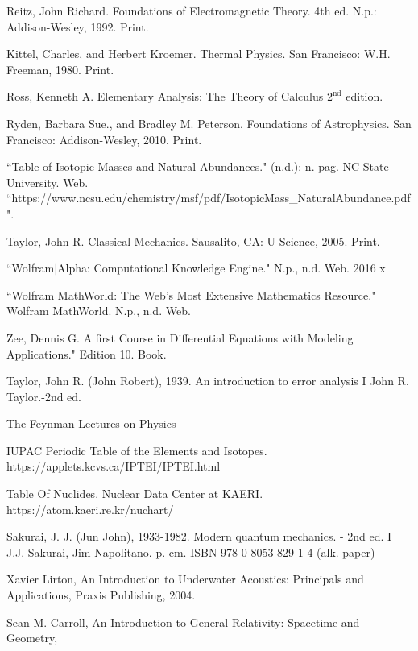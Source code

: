 {\begin{thebibliography}{99}
	
	 Reitz, John Richard. Foundations of Electromagnetic Theory. 4th ed. N.p.: Addison-Wesley, 1992. Print. 
	
	  Kittel, Charles, and Herbert Kroemer. Thermal Physics. San Francisco: W.H. Freeman, 1980. Print.
	
	
	 Ross, Kenneth A. Elementary Analysis: The Theory of Calculus $2^{\textrm{nd}}$ edition. 
	
	 Ryden, Barbara Sue., and Bradley M. Peterson. Foundations of Astrophysics. San Francisco: Addison-Wesley, 2010. Print. 
	
	 ``Table of Isotopic Masses and Natural Abundances." (n.d.): n. pag. NC State University. Web. ``https://www.ncsu.edu/chemistry/msf/pdf/IsotopicMass\_NaturalAbundance.pdf". 
	
	 Taylor, John R. Classical Mechanics. Sausalito, CA: U Science, 2005. Print. 
	
	 ``Wolfram$|$Alpha: Computational Knowledge Engine." N.p., n.d. Web. 2016 x
	
	 ``Wolfram MathWorld: The Web's Most Extensive Mathematics Resource." Wolfram MathWorld. N.p., n.d. Web. 
	
	 Zee, Dennis G. A first Course in Differential Equations with Modeling Applications." Edition 10. Book.
	
	 Taylor, John R. (John Robert), 1939. An introduction to error analysis I John R. Taylor.-2nd ed.
	
	 The Feynman Lectures on Physics

 	 IUPAC Periodic Table of the Elements and Isotopes. https://applets.kcvs.ca/IPTEI/IPTEI.html

  	 Table Of Nuclides.  Nuclear Data Center at KAERI. https://atom.kaeri.re.kr/nuchart/

   	 Sakurai, J. J. (Jun John), 1933-1982. Modern quantum mechanics. - 2nd ed. I J.J. Sakurai, Jim Napolitano. p. cm. ISBN 978-0-8053-829 1-4 (alk. paper)

	 Xavier Lirton, An Introduction to Underwater Acoustics: Principals and Applications, Praxis Publishing, 2004.

	 Sean M. Carroll, An Introduction to General Relativity: Spacetime and Geometry, 
\end{thebibliography}
}
